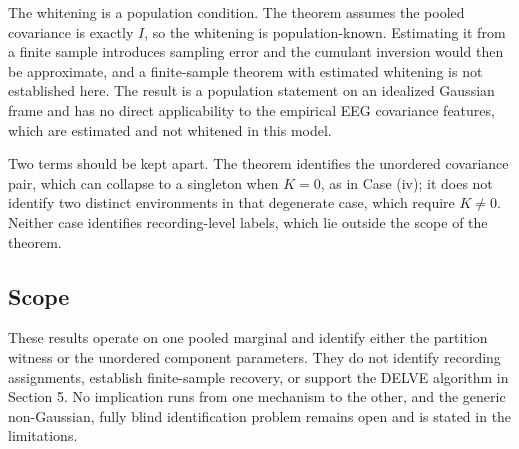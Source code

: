 The whitening is a population condition. The theorem assumes the pooled
covariance is exactly \(I\), so the whitening is population-known.
Estimating it from a finite sample introduces sampling error and the
cumulant inversion would then be approximate, and a finite-sample
theorem with estimated whitening is not established here. The result is
a population statement on an idealized Gaussian frame and has no direct
applicability to the empirical EEG covariance features, which are
estimated and not whitened in this model.

Two terms should be kept apart. The theorem identifies the unordered
covariance pair, which can collapse to a singleton when \(K=0\), as in
Case (iv); it does not identify two distinct environments in that
degenerate case, which require \(K\ne0\). Neither case identifies
recording-level labels, which lie outside the scope of the theorem.

\subsection{Scope}\label{scope-4}

These results operate on one pooled marginal and identify either the
partition witness or the unordered component parameters. They do not
identify recording assignments, establish finite-sample recovery, or
support the DELVE algorithm in Section 5. No implication runs from one
mechanism to the other, and the generic non-Gaussian, fully blind
identification problem remains open and is stated in the limitations.
